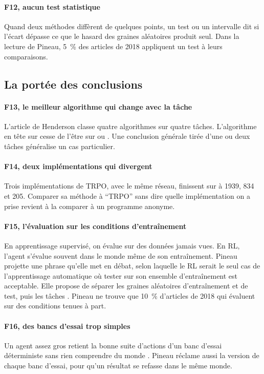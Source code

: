 \paragraph{F12, aucun test statistique}
Quand deux méthodes diffèrent de quelques points, un test ou un intervalle dit si l'écart dépasse ce
que le hasard des graines aléatoires produit seul. Dans la lecture de Pineau, 5~\% des articles de
2018 appliquent un test à leurs comparaisons.

\subsection{La portée des conclusions}

\paragraph{F13, le meilleur algorithme qui change avec la tâche}
L'article de Henderson classe quatre algorithmes sur quatre tâches. L'algorithme en tête sur
 cesse de l'être sur  ou . Une conclusion générale tirée
d'une ou deux tâches généralise un cas particulier.

\paragraph{F14, deux implémentations qui divergent}
Trois implémentations de TRPO, avec le même réseau, finissent sur  à \num{1939}, 834 et
205. Comparer sa méthode à \enquote{TRPO} sans dire quelle implémentation on a prise revient à la
comparer à un programme anonyme.

\paragraph{F15, l'évaluation sur les conditions d'entraînement}
En apprentissage supervisé, on évalue sur des données jamais vues. En RL, l'agent s'évalue souvent dans
le monde même de son entraînement. Pineau projette une phrase qu'elle met en débat, selon laquelle le
RL serait le seul cas de l'apprentissage automatique où tester sur son ensemble d'entraînement est
acceptable. Elle propose de séparer les graines aléatoires d'entraînement et de test, puis les tâches
\parencite{zhang2018dissection,zhang2018natural}. Pineau ne trouve que 10~\% d'articles de 2018 qui
évaluent sur des conditions tenues à part.

\paragraph{F16, des bancs d'essai trop simples}
Un agent assez gros retient la bonne suite d'actions d'un banc d'essai déterministe sans rien
comprendre du monde \parencite{machado2018revisiting}. Pineau réclame aussi la version de chaque banc
d'essai, pour qu'un résultat se refasse dans le même monde.

